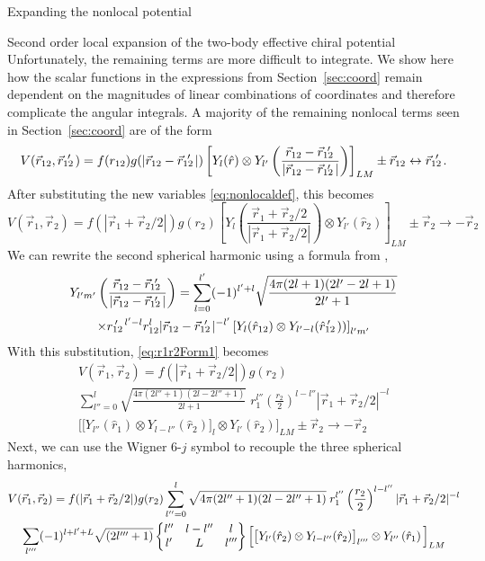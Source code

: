 \begin{section}{Expanding the nonlocal potential}
\begin{section}{Second order local expansion of the two-body effective chiral potential}
Unfortunately, the remaining terms are more difficult to integrate. We show here how the scalar functions in the expressions from Section~\ref{sec:coord} remain dependent on the magnitudes of linear combinations of coordinates and therefore complicate the angular integrals. A majority of the remaining nonlocal terms seen in Section~\ref{sec:coord} are of the form
%
\begin{equation}
V(\rot,\rotp)=f(r_{12})g(|\rot-\rotp |) \left[Y_{l}(\hat{r})\otimes Y_{l'}\left(\frac{\rot-\rotp}{|\rot-\rotp |}\right)\right]_{L M}\pm \rot\leftrightarrow \rotp.
\end{equation}
%
After substituting the new variables \eqref{eq:nonlocaldef}, this becomes
%
\begin{equation}\label{eq:r1r2Form1}
V(\vec{r}_1,\vec{r}_2)=f(|\vec{r}_1+\vec{r}_2/2|)g(r_2) \left[Y_{l}\left(\frac{\vec{r}_1+\vec{r}_2/2}{|\vec{r}_1+\vec{r}_2/2|}\right)\otimes Y_{l'}\left(\hat{r}_2\right)\right]_{L M} \pm \vec{r}_2\rightarrow -\vec{r}_2
\end{equation} 
%
We can rewrite the second spherical harmonic using a formula from \cite{varshalovich1988},
%
\begin{multline}
Y_{l'm'}\left(\frac{\rot-\rotp}{|\rot-\rotp |}\right) = \sum_{l=0}^{l'}(-1)^{l'+l}\sqrt{\frac{4\pi(2l+1)(2l'-2l+1)}{2l'+1}} \\
\times \rotpr^{l'-l} r_{12}^l |\rot-\rotp|^{-l'}\left[Y_{l}(\hat{r}_{12})\otimes Y_{l'-l}(\rotphat))\right]_{l'm'}
\end{multline}
With this substitution, \eqref{eq:r1r2Form1} becomes
\begin{multline}
V(\vec{r}_1,\vec{r}_2)=f(|\vec{r}_1+\vec{r}_2/2|)g(r_2) \\
\sum_{l''=0}^{l} \sqrt{\frac{4\pi(2l''+1)(2l-2l''+1)}{2l+1}} \;r_1^{l''} \left(\frac{r_2}{2}\right)^{l-l''}|\vec{r}_1+\vec{r}_2/2|^{-l} \\
 \Big[\big[Y_{l''}(\hat{r}_1) \otimes Y_{l-l''}(\hat{r}_2) \big]_l \otimes Y_{l'}\left(\hat{r}_2\right)\Big]_{L M} \pm \vec{r}_2 \rightarrow -\vec{r}_2
\end{multline}
Next, we can use the Wigner 6-$j$ symbol to recouple the three spherical harmonics, 
\begin{multline}
V(\vec{r}_1,\vec{r}_2)=f(|\vec{r}_1+\vec{r}_2/2|)g(r_2) 
\sum_{l''=0}^{l} \sqrt{4\pi(2l''+1)(2l-2l''+1)} \;r_1^{l''} \left(\frac{r_2}{2}\right)^{l-l''}|\vec{r}_1+\vec{r}_2/2|^{-l} \\
\sum_{l'''} (-1)^{l+l'+L} \sqrt{(2l'''+1)} \sixj{l''}{l-l''}{l}{l'}{L}{l'''} \Big[\big[Y_{l'}(\hat{r}_2) \otimes Y_{l-l''}(\hat{r}_2) \big]_{l'''} \otimes Y_{l''}\left(\hat{r}_1\right)\Big]_{L M} \\

\end{multline}
\end{section}
\end{section}

